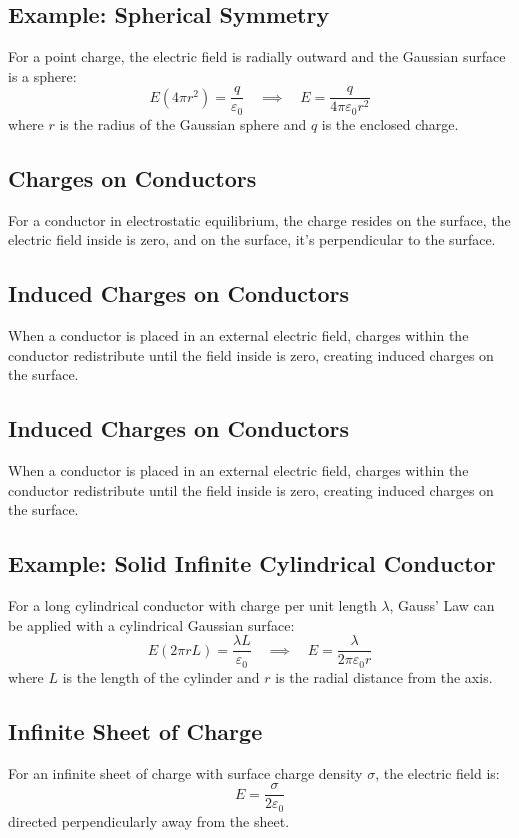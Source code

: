 \documentclass{article}
\begin{document}
\subsection*{Example: Spherical Symmetry}
For a point charge, the electric field is radially outward and the Gaussian surface is a sphere:
\begin{equation}
    E(4\pi r^2) = \frac{q}{\varepsilon_0} \quad \implies \quad E = \frac{q}{4\pi \varepsilon_0 r^2}
\end{equation}
where $r$ is the radius of the Gaussian sphere and $q$ is the enclosed charge.

\subsection*{Charges on Conductors}
For a conductor in electrostatic equilibrium, the charge resides on the surface, the electric field inside is zero, and on the surface, it's perpendicular to the surface.

\subsection*{Induced Charges on Conductors}
When a conductor is placed in an external electric field, charges within the conductor redistribute until the field inside is zero, creating induced charges on the surface.

\subsection*{Induced Charges on Conductors}
When a conductor is placed in an external electric field, charges within the conductor redistribute until the field inside is zero, creating induced charges on the surface.

\subsection*{Example: Solid Infinite Cylindrical Conductor}
For a long cylindrical conductor with charge per unit length $\lambda$, Gauss' Law can be applied with a cylindrical Gaussian surface:
\begin{equation}
    E(2\pi rL) = \frac{\lambda L}{\varepsilon_0} \quad \implies \quad E = \frac{\lambda}{2\pi\varepsilon_0 r}
\end{equation}
where $L$ is the length of the cylinder and $r$ is the radial distance from the axis.

\subsection*{Infinite Sheet of Charge}
For an infinite sheet of charge with surface charge density $\sigma$, the electric field is:
\begin{equation}
    E = \frac{\sigma}{2\varepsilon_0}
\end{equation}
directed perpendicularly away from the sheet.
\end{document}

